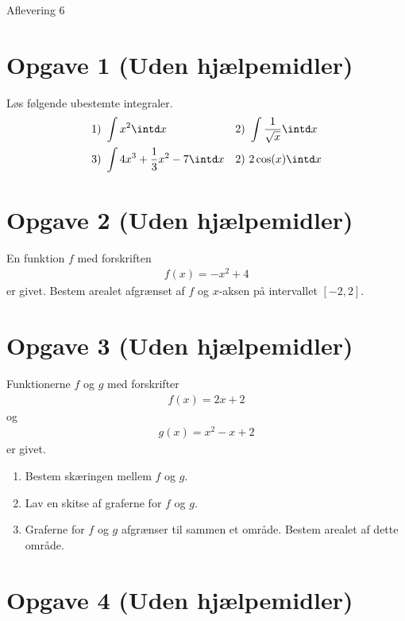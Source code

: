 
\begin{center}
\Huge
Aflevering 6
\end{center}

\section*{Opgave 1 (Uden hjælpemidler)}

Løs følgende ubestemte integraler.
\begin{align*}
&1)  \ \int x^2 \intd x   &&2) \  \int \frac{1}{\sqrt{x}} \intd x   \\
&3)  \ \int 4x^3+\frac{1}{3}x^2 -7 \intd x &&2) \  2\cos(x) \intd x    \\
\end{align*}

\section*{Opgave 2 (Uden hjælpemidler)}
En funktion $f$ med forskriften 
\begin{align*}
f(x) = -x^2+4
\end{align*}
er givet. Bestem arealet afgrænset af $f$ og $x$-aksen på intervallet $[-2,2]$. 

\section*{Opgave 3 (Uden hjælpemidler)}

Funktionerne $f$ og $g$ med forskrifter
\begin{align*}
f(x) = 2x+2
\end{align*}
og
\begin{align*}
g(x) = x^2-x+2
\end{align*}
er givet.
\begin{enumerate}[label=\roman*)]
\item Bestem skæringen mellem $f$ og $g$. 
\item Lav en skitse af graferne for $f$ og $g$.
\item Graferne for $f$ og $g$ afgrænser til sammen et område. Bestem arealet af dette område.
\end{enumerate}

\section*{Opgave 4 (Uden hjælpemidler)}


